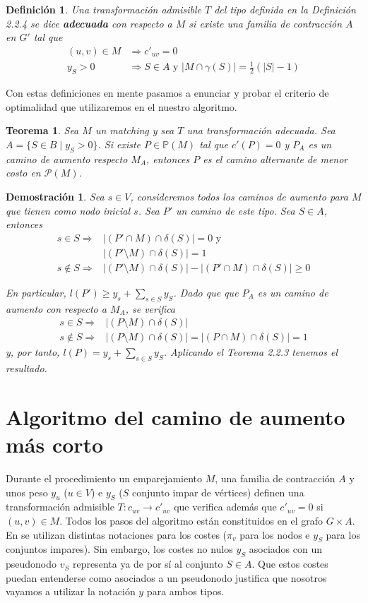 \documentclass[twoside,a4paper,openright,12pt]{book}
\newtheorem{defi}{Definici\'on}[section]
\newtheorem{thm}{Teorema}[section]
\newtheorem*{dem}{Demostración}
\begin{document}
\begin{defi}
Una transformación admisible $T$ del tipo definida en la Definición 2.2.4 se dice \textbf{adecuada} con respecto a $M$ si existe una familia de contracción $A$ en $G'$ tal que
\begin{align*}
(u,v)\in M &\Rightarrow c'_{uv} = 0\\
y_S>0&\Rightarrow S\in A \text{ y } |M\cap \gamma(S)| = \frac{1}{2}(|S|-1)
\end{align*}
\end{defi}
Con estas definiciones en mente pasamos a enunciar y probar el criterio de optimalidad que utilizaremos en el nuestro algoritmo.
\begin{thm}
Sea $M$ un matching y sea $T$ una transformación adecuada. Sea $A = \{S \in B\mid y_S>0\}$. Si existe $P\in \mathbb{P}(M)$ tal que $c'(P)=0$ y $P_A$ es un camino de aumento respecto $M_A$, entonces $P$ es el camino alternante de menor costo en $\mathcal{P}(M)$.
\end{thm}
\begin{dem}
Sea $s\in V$, consideremos todos los caminos de aumento para $M$ que tienen como nodo inicial $s$. Sea $P'$ un camino de este tipo. Sea $S\in A$, entonces
\begin{align*}
s\in S \Rightarrow & |(P'\cap M)\cap \delta(S)| = 0 \text{ y}\\
& |(P'\setminus M)\cap \delta(S)| = 1\\
s\notin S \Rightarrow & |(P'\setminus M)\cap \delta(S)| - |(P'\cap M)\cap \delta(S)| \geq 0
\end{align*}

En particular, $l(P')\geq y_s + \sum_{s\in S}y_S$. Dado que que $P_A$  es un camino de aumento con respecto a $M_A$, se verifica
\begin{align*}
s\in S \Rightarrow & |(P\setminus M)\cap \delta(S)|\\
s\notin S \Rightarrow & |(P\setminus M)\cap \delta(S)| = |(P\cap M)\cap \delta(S)| =1
\end{align*}
y, por tanto, $l(P) = y_s  + \sum_{s\in S} y_S$. Aplicando el Teorema 2.2.3 tenemos el resultado.
\end{dem}
\section{Algoritmo del camino de aumento más corto}
Durante el procedimiento un emparejamiento $M$, una familia de contracción $A$ y unos peso $y_u$ ($u \in V$) e $y_S$ ($S$ conjunto impar de vértices) definen una transformación admisible $T:c_{uv}\to c'_{uv}$ que verifica además que $c'_{uv}=0$ si $(u,v)\in M$. Todos los pasos del algoritmo están constituidos en el grafo $G\times A$. En \cite{inte} se utilizan distintas notaciones para los costes ($\pi_v$ para los nodos e $y_S$ para los conjuntos impares). Sin embargo, los costes no nulos $y_S$ asociados con un pseudonodo $v_S$ representa ya de por sí al conjunto $S\in A$. Que estos costes puedan entenderse como asociados a un pseudonodo justifica que nosotros vayamos a utilizar la notación $y$ para ambos tipos. 
\end{document}
